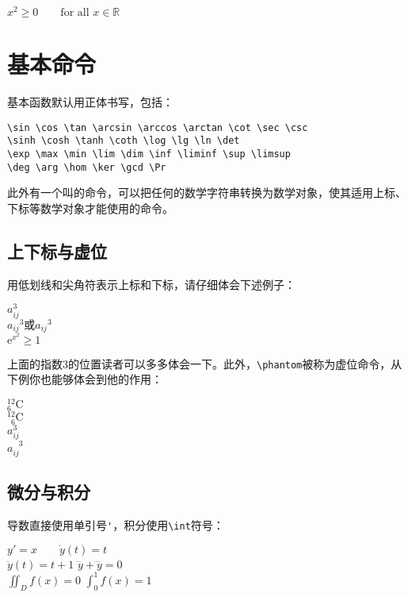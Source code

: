 {\begin{codeshow}
$x^2 \geq 0 \qquad
\textrm{for all }x\in\mathbb{R}$
\end{codeshow}

\section{基本命令}
基本函数默认用正体书写，包括：
\begin{verbatim}
\sin \cos \tan \arcsin \arccos \arctan \cot \sec \csc
\sinh \cosh \tanh \coth \log \lg \ln \det
\exp \max \min \lim \dim \inf \liminf \sup \limsup
\deg \arg \hom \ker \gcd \Pr
\end{verbatim}

此外有一个叫\latexline{\\mathop}的命令，可以把任何的数学字符串转换为数学对象，使其适用上标、下标等数学对象才能使用的命令。

\subsection{上下标与虚位}
用低划线和尖角符表示上标和下标，请仔细体会下述例子：

\begin{codeshow}
$a^3_{ij}$ \\
${a_{ij}}^3\text{或}a_{ij}{}^3$\\
$\mathrm{e}^{x^2}\geq 1$
\end{codeshow}

上面的指数3的位置读者可以多多体会一下。此外，\verb|\phantom|被称为虚位命令，从下例你也能够体会到他的作用：

\begin{codeshow}
${}^{12}_{6}\mathrm{C}$ \\
${}^{12}_{\phantom{1}6}
\mathrm{C}$ \\
$a^3_{ij}$ \\
$a^{\phantom{ij}3}_{ij}$
\end{codeshow}

\subsection{微分与积分}
导数直接使用单引号\verb|'|，积分使用\verb|\int|符号：

\begin{codeshow}
$y'=x \qquad \dot{y}(t)=t$ \\
$\ddot{y}(t)=t+1$
$\dddot{y}+\ddddot{y}=0$ \\
$\iint_{D}f(x)=0$
$\int_{0}^{1}f(x)=1$
\end{codeshow}

}
